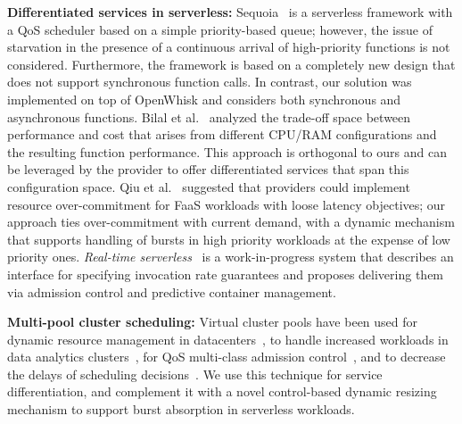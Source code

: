 \noindent\textbf{Differentiated services in serverless:}
Sequoia~\cite{Tariq:SOCC:2020:Sequoia} is a serverless framework with a QoS scheduler based on a simple priority-based queue; however, the issue of starvation in the presence of a continuous arrival of high-priority functions is not considered.
Furthermore, the framework is based on a completely new design that does not support synchronous function calls.
In contrast, our solution was implemented on top of OpenWhisk and considers both synchronous and asynchronous functions.
Bilal et al.~\cite{Bilal:CoRR:2021:GreatFreedom} analyzed the trade-off space between performance and cost that arises from different CPU/RAM configurations and the resulting function performance.
This approach is orthogonal to ours and can be leveraged by the provider to offer differentiated services that span this configuration space.
Qiu et al.~\cite{Qiu:WOSC:2021:LatencyCritical} suggested that providers could implement resource over-commitment for FaaS workloads with loose latency objectives;
our approach ties over-commitment with current demand, with a dynamic mechanism that supports handling of bursts in high priority workloads at the expense of low priority ones.
\emph{Real-time serverless}~\cite{Nguyen:WoSC:2019:Real-Time} is a work-in-progress system that describes an interface for specifying invocation rate guarantees and proposes delivering them via admission control and predictive container management.


\noindent\textbf{Multi-pool cluster scheduling:}
Virtual cluster pools have been used for dynamic resource management in datacenters~\cite{Chase:HPDC:2003:COD}, to handle increased workloads in data analytics clusters~\cite{Lee:HotCloud:2011:Heterogeneity-Aware}, for QoS multi-class admission control~\cite{Delimitrou:ICAC:2013:ARQ}, and to decrease the delays of scheduling decisions~\cite{singhvi2021atoll}. 
We use this technique for service differentiation, and complement it with a novel control-based dynamic resizing mechanism to support burst absorption in serverless workloads.

